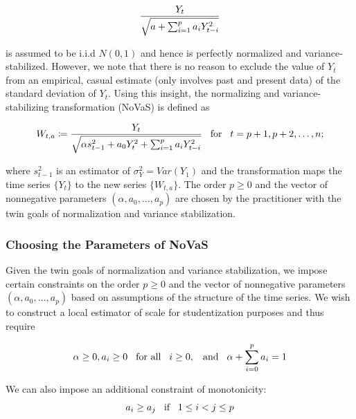 \documentclass[11pt,]{article}
\begin{document}
\begin{equation}
\frac{Y_t}{\sqrtsign{a + \sum_{i=1}^p a_i Y_{t-i}^2}}
\end{equation}

is assumed to be i.i.d $N(0,1)$ and hence is perfectly normalized and variance-stabilized. However, we note that there is no reason to exclude the value of $Y_t$ from an empirical, casual estimate (only involves past and present data) of the standard deviation of $Y_t$. Using this insight, the normalizing and variance-stabilizing transformation (NoVaS) is defined as

\begin{equation}
W_{t,a} \coloneqq \frac{Y_t}{\sqrtsign{\alpha s_{t-1}^2 + a_{0} Y_{t}^2 + \sum_{i=1}^p a_i Y_{t-i}^2}} \hspace{0.3cm} \text{for} \hspace{0.3cm} t = p+1, p+2, \dots, n; 
\end{equation}

where $s_{t-1}^2$ is an estimator of $\sigma_{Y}^2 = Var(Y_1)$ and the transformation maps the time series $\{Y_t\}$ to the new series $\{W_{t,a}\}$. The order $p \geq 0$ and the vector of nonnegative parameters $(\alpha, a_0, \dots, a_p)$ are chosen by the practitioner with the twin goals of normalization and variance stabilization.

\subsubsection{Choosing the Parameters of NoVaS}
Given the twin goals of normalization and variance stabilization, we impose certain constraints on the order $p \geq 0$ and the vector of nonnegative parameters $(\alpha, a_0, \dots, a_p)$ based on assumptions of the structure of the time series. We wish to construct a local estimator of scale for studentization purposes and thus require

\begin{equation}
\alpha \geq 0, a_i \geq 0 \hspace{0.3cm} \text{for all} \hspace{0.3cm} i \geq 0, \hspace{0.3cm} \text{and} \hspace{0.3cm} \alpha + \sum_{i=0}^{p} a_i = 1
\end{equation}

We can also impose an additional constraint of monotonicity: 
\begin{equation}
a_i \geq a_j \hspace{0.3cm} \text{if} \hspace{0.3cm} 1 \leq i < j \leq p
\end{equation}
\end{document}
